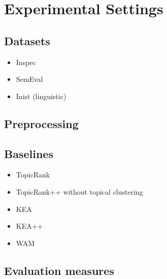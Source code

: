\section{Experimental Settings}
\label{sec:experimental_settings}
  \subsection{Datasets}
  \label{subsec:datasets}
    \begin{itemize}
      \item{Inspec}
      \item{SemEval}
      \item{Inist (linguistic)}
    \end{itemize}

  \subsection{Preprocessing}
  \label{subsec:preprocessing}

  \subsection{Baselines}
  \label{subsec:baselines}
    \begin{itemize}
      \item{TopicRank}
      \item{TopicRank++ without topical clustering}
      \item{KEA}
      \item{KEA++}
      \item{WAM}
    \end{itemize}

  \subsection{Evaluation measures}
  \label{subsec:evaluation_measures}

